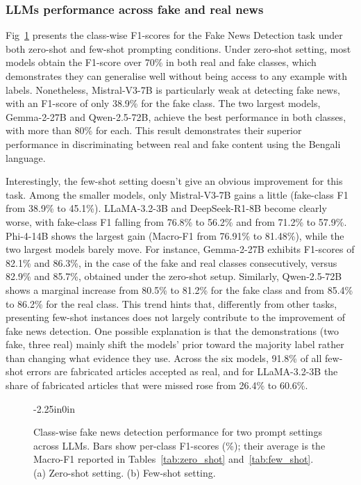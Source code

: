 \documentclass[10pt,letterpaper]{article}
\begin{document}
\subsubsection*{LLMs performance across fake and real news}
\label{sec:fake_classwise}

Fig~\ref{fig:fake_classwise} presents the class-wise F1-scores for the Fake News Detection task under both zero-shot and few-shot prompting conditions. Under zero-shot setting, most models obtain the F1-score over 70\% in both real and fake classes, which demonstrates they can generalise well without being access to any example with labels. Nonetheless, Mistral-V3-7B is particularly weak at detecting fake news, with an F1-score of only 38.9\% for the fake class. The two largest models, Gemma-2-27B and Qwen-2.5-72B, achieve the best performance in both classes, with more than 80\% for each. This result demonstrates their superior performance in discriminating between real and fake content using the Bengali language.

Interestingly, the few-shot setting doesn't give an obvious improvement for this task. Among the smaller models, only Mistral-V3-7B gains a little (fake-class F1 from 38.9\% to 45.1\%). LLaMA-3.2-3B and DeepSeek-R1-8B become clearly worse, with fake-class F1 falling from 76.8\% to 56.2\% and from 71.2\% to 57.9\%. Phi-4-14B shows the largest gain (Macro-F1 from 76.91\% to 81.48\%), while the two largest models barely move. For instance, Gemma-2-27B exhibits F1-scores of 82.1\% and 86.3\%, in the case of the fake and real classes consecutively, versus 82.9\% and 85.7\%, obtained under the zero-shot setup. Similarly, Qwen-2.5-72B shows a marginal increase from 80.5\% to 81.2\% for the fake class and from 85.4\% to 86.2\% for the real class. This trend hints that, differently from other tasks, presenting few-shot instances does not largely contribute to the improvement of fake news detection. One possible explanation is that the demonstrations (two fake, three real) mainly shift the models' prior toward the majority label rather than changing what evidence they use. Across the six models, 91.8\% of all few-shot errors are fabricated articles accepted as real, and for LLaMA-3.2-3B the share of fabricated articles that were missed rose from 26.4\% to 60.6\%.

\begin{figure}[t]
\begin{adjustwidth}{-2.25in}{0in}
    \centering
    \caption{Class-wise fake news detection performance for two prompt settings across LLMs. Bars show per-class F1-scores (\%); their average is the Macro-F1 reported in Tables~\ref{tab:zero_shot} and~\ref{tab:few_shot}. (a) Zero-shot setting. (b) Few-shot setting.}
    \label{fig:fake_classwise}
\end{adjustwidth}
\end{figure}
\end{document}
